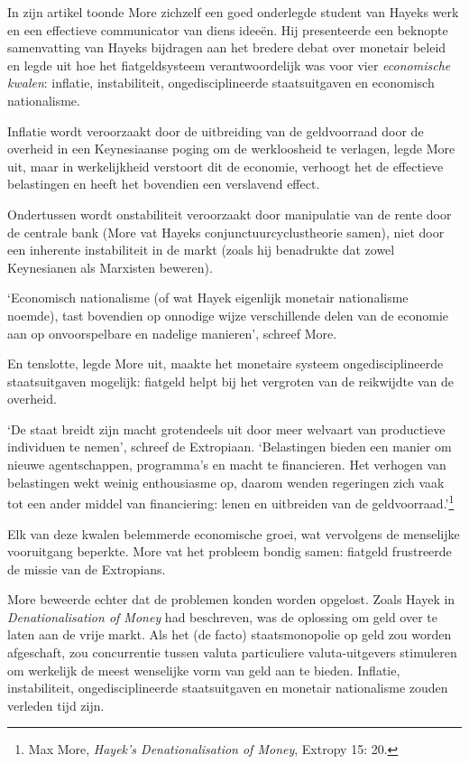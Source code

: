 \documentclass[
  a5paper,
  smalldemyvopaper,11pt,twoside,onecolumn,openright,extrafontsizes,
hidelinks]{memoir}
\begin{document}
In zijn artikel toonde More zichzelf een goed onderlegde student van
Hayeks werk en een effectieve communicator van diens ideeën. Hij
presenteerde een beknopte samenvatting van Hayeks bijdragen aan het
bredere debat over monetair beleid en legde uit hoe het fiatgeldsysteem
verantwoordelijk was voor vier \emph{economische kwalen}: inflatie,
instabiliteit, ongedisciplineerde staatsuitgaven en economisch
nationalisme.

Inflatie wordt veroorzaakt door de uitbreiding van de geldvoorraad door
de overheid in een Keynesiaanse poging om de werkloosheid te verlagen,
legde More uit, maar in werkelijkheid verstoort dit de economie,
verhoogt het de effectieve belastingen en heeft het bovendien een
verslavend effect.

Ondertussen wordt onstabiliteit veroorzaakt door manipulatie van de
rente door de centrale bank (More vat Hayeks conjunctuurcyclustheorie
samen), niet door een inherente instabiliteit in de markt (zoals hij
benadrukte dat zowel Keynesianen als Marxisten beweren).

`Economisch nationalisme (of wat Hayek eigenlijk monetair nationalisme
noemde), tast bovendien op onnodige wijze verschillende delen van de
economie aan op onvoorspelbare en nadelige manieren', schreef More.

En tenslotte, legde More uit, maakte het monetaire systeem
ongedisciplineerde staatsuitgaven mogelijk: fiatgeld helpt bij het
vergroten van de reikwijdte van de overheid.

`De staat breidt zijn macht grotendeels uit door meer welvaart van
productieve individuen te nemen', schreef de Extropiaan. `Belastingen
bieden een manier om nieuwe agentschappen, programma's en macht te
financieren. Het verhogen van belastingen wekt weinig enthousiasme op,
daarom wenden regeringen zich vaak tot een ander middel van
financiering: lenen en uitbreiden van de geldvoorraad.'\footnote{Max
  More, \emph{Hayek's Denationalisation of Money}, Extropy 15: 20.}

Elk van deze kwalen belemmerde economische groei, wat vervolgens de
menselijke vooruitgang beperkte. More vat het probleem bondig samen:
fiatgeld frustreerde de missie van de Extropians.

More beweerde echter dat de problemen konden worden opgelost. Zoals
Hayek in \emph{Denationalisation of Money} had beschreven, was de
oplossing om geld over te laten aan de vrije markt. Als het (de facto)
staatsmonopolie op geld zou worden afgeschaft, zou concurrentie tussen
valuta particuliere valuta-uitgevers stimuleren om werkelijk de meest
wenselijke vorm van geld aan te bieden. Inflatie, instabiliteit,
ongedisciplineerde staatsuitgaven en monetair nationalisme zouden
verleden tijd zijn.
\end{document}
